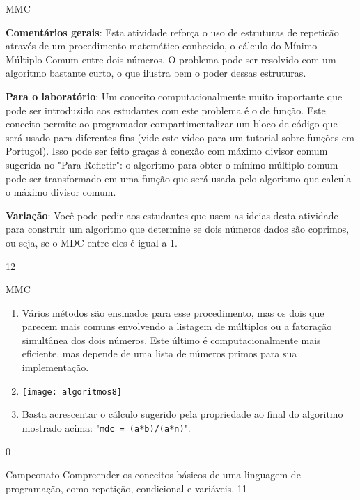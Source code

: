 \begin{sugestions}{MMC}
{
\textbf{Comentários gerais}: Esta atividade reforça o uso de estruturas de repeticão através de um procedimento matemático conhecido, o cálculo do Mínimo Múltiplo Comum entre dois números. O problema pode ser resolvido com um algoritmo bastante curto, o que ilustra bem o poder dessas estruturas.

\textbf{Para o laboratório}: Um conceito computacionalmente muito importante que pode ser introduzido aos estudantes com este problema é o de função. Este conceito permite ao programador compartimentalizar um bloco de código que será usado para diferentes fins (vide este vídeo para um tutorial sobre funções em Portugol). Isso pode ser feito graças à conexão com máximo divisor comum sugerida no "Para Refletir": o algoritmo para obter o mínimo múltiplo comum pode ser transformado em uma função que será usada pelo algoritmo que calcula o máximo divisor comum.

\textbf{Variação}: Você pode pedir aos estudantes que usem as ideias desta atividade para construir um algoritmo que determine se dois números dados são coprimos, ou seja, se o MDC entre eles é igual a 1.
}{1}{2}
\end{sugestions}
\begin{answer}{MMC}
{
\begin{enumerate}
\item Vários métodos são ensinados para esse procedimento, mas os dois que parecem mais comuns envolvendo a listagem de múltiplos ou a fatoração simultânea dos dois números. Este último é computacionalmente mais eficiente, mas depende de uma lista de números primos para sua implementação.

\item {}
{
\texttt{[image: algoritmos8]}
}

\item Basta acrescentar o cálculo sugerido pela propriedade ao final do algoritmo mostrado acima: "\texttt{mdc = (a*b)/(a*n)}".
\end{enumerate}
}{0}
\end{answer}
\begin{objectives}{Campeonato}
{
Compreender os conceitos básicos de uma linguagem de programação, como repetição, condicional e variáveis.
}{1}{1}
\end{objectives}
